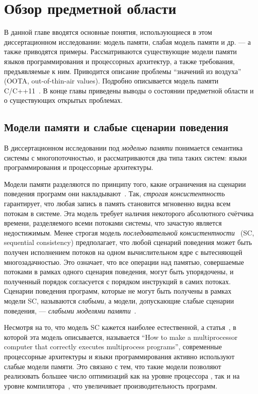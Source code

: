 \chapter{Обзор предметной области} \label{sec:overview}
В данной главе вводятся основные понятия, использующиеся в этом диссертационном исследовании: модель памяти, слабая модель памяти
и др. --- а также приводятся примеры.
Рассматриваются существующие модели памяти языков программирования и
процессорных архитектур, а также требования, предъявляемые к ним.
Приводится описание проблемы ``значений из воздуха''\label{acr:oota} (OOTA, out-of-thin-air values).
Подробно описывается модель памяти C/C++11~\cite{Batty-al:POPL11}.
В конце главы приведены выводы о состоянии предметной области и о существующих
открытых проблемах.

\section{Модели памяти и слабые сценарии поведения}
В диссертационном исследовании под \emph{моделью памяти} понимается семантика системы с многопоточностью,
и рассматриваются два типа таких систем: языки программирования и процессорные архитектуры.

Модели памяти разделяются по принципу того, какие ограничения на сценарии поведения
программ они накладывают~\cite{Kshemkalyani-Singhal:2011}.
Так, \emph{строгая консистентность} гарантирует, что любая запись в память становится мгновенно видна
всем потокам в системе. Эта модель требует наличия некоторого абсолютного счётчика времени, разделяемого
всеми потоками системы, что зачастую является недостижимым.
Менее строгая модель \emph{последовательной консистентности}~\cite{Lamport:TC79}
(SC, sequential consistency)\label{acr:sc}
предполагает, что любой сценарий поведения может быть получен исполнением потоков на одном вычислительном
ядре с вытесняющей многозадачностью. Это означает, что все операции над памятью, совершаемые потоками в рамках
одного сценария поведения,
могут быть упорядочены, и полученный порядок согласуется с порядком инструкций в самих потоках.
Сценарии поведения программ, которые не могут быть получены в рамках модели SC, называются
\emph{слабыми}, а модели, допускающие слабые сценарии поведения, --- \emph{слабыми моделями памяти}~\cite{Adve-Gharachorloo:IEEE96}.

Несмотря на то, что модель SC кажется наиболее естественной, а статья~\cite{Lamport:TC79},
в которой эта модель описывается, называется ``How to make a multiprocessor computer that correctly executes multiprocess programs'',
современные процессорные архитектуры и языки программирования активно используют слабые модели памяти. Это 
связано с тем, что такие модели позволяют реализовать большее число оптимизаций как на уровне процессора
\cite{Hennessy-Patterson:BOOK}, так и на уровне компилятора~\cite{Aho-al:BOOK86,Muchnick:BOOK97},
что увеличивает производительность программ.


